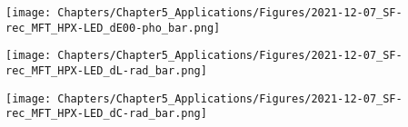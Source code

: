 \begin{figure*}
\centering
\texttt{[image: Chapters/Chapter5\_Applications/Figures/2021-12-07\_SF-rec\_MFT\_HPX-LED\_dE00-pho\_bar.png]}
\caption[\hspace{0.3cm}\textit{Sunflowers} reconstruction - MFT results, \dEOO values]{\dEOO values after a light exposure of 400 \unit{\kilo\lux\hour} (a) and 2000 \unit{\kilo\lux\hour} (b). More information about the creation of these figures is given in Appendix \ref{app:ch5_MFT_SF-rec_dE00-curves}.}
\label{fig:SF_dE00_hist}
\end{figure*}


\begin{figure*}[!h]
\centering
\texttt{[image: Chapters/Chapter5\_Applications/Figures/2021-12-07\_SF-rec\_MFT\_HPX-LED\_dL-rad\_bar.png]}
\caption[\hspace{0.3cm}\textit{Sunflowers} reconstruction - MFT results, \dL values]{\dL values after a light exposure of 4 \unit{\mega\joule\per\square\metre}.}
\label{fig:SF_dL_hist}
\end{figure*}


\begin{figure*}[!h]
\centering
\texttt{[image: Chapters/Chapter5\_Applications/Figures/2021-12-07\_SF-rec\_MFT\_HPX-LED\_dC-rad\_bar.png]}
\caption[\hspace{0.3cm}\textit{Sunflowers} reconstruction - MFT results, \dC values]{\dC values after a light exposure of 4 \unit{\mega\joule\per\square\metre}.}
\label{fig:SF_dC_hist}
\end{figure*}

\newpage

